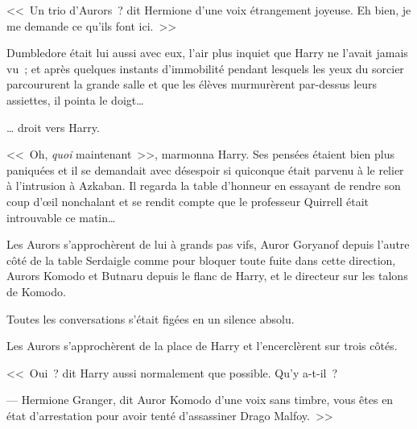 <<~Un trio d'Aurors~? dit Hermione d'une voix étrangement joyeuse. Eh bien, je me demande ce qu'ils font ici.~>>

Dumbledore était lui aussi avec eux, l'air plus inquiet que Harry ne l'avait jamais vu~; et après quelques instants d'immobilité pendant lesquels les yeux du sorcier parcoururent la grande salle et que les élèves murmurèrent par-dessus leurs assiettes, il pointa le doigt…

… droit vers Harry.

<<~Oh, \emph{quoi} maintenant~>>, marmonna Harry. Ses pensées étaient bien plus paniquées et il se demandait avec désespoir si quiconque était parvenu à le relier à l'intrusion à Azkaban. Il regarda la table d'honneur en essayant de rendre son coup d'œil nonchalant et se rendit compte que le professeur Quirrell était introuvable ce matin…

Les Aurors s'approchèrent de lui à grands pas vifs, Auror Goryanof depuis l'autre côté de la table Serdaigle comme pour bloquer toute fuite dans cette direction, Aurors Komodo et Butnaru depuis le flanc de Harry, et le directeur sur les talons de Komodo.

Toutes les conversations s'était figées en un silence absolu.

Les Aurors s'approchèrent de la place de Harry et l'encerclèrent sur trois côtés.

<<~Oui~? dit Harry aussi normalement que possible. Qu'y a-t-il~?

--- Hermione Granger, dit Auror Komodo d'une voix sans timbre, vous êtes en état d'arrestation pour avoir tenté d'assassiner Drago Malfoy.~>>
